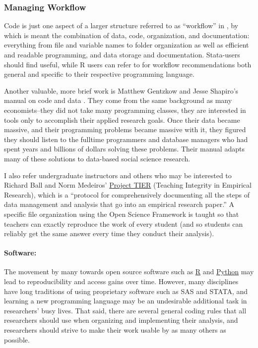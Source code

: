 \documentclass[12pt] {article}
\begin{document}
\subsubsection{Managing Workflow}\label{managing-workflow}

Code is just one aspect of a larger structure referred to as
``workflow'' in \cite{long_workflow_2008}, by which is meant the
combination of data, code, organization, and documentation: everything
from file and variable names to folder organization as well as efficient
and readable programming, and data storage and documentation. Stata-users should find \cite{long_workflow_2008} useful, while R users can refer to \cite{gandrud2013reproducible} for workflow recommendations both general and specific to their respective programming language.

Another valuable, more brief work is Matthew Gentzkow and Jesse Shapiro's manual on code and data \href{http://faculty.chicagobooth.edu/jesse.shapiro/research/CodeAndData.pdf}{\citep{GentzkowShapiro}}. They come from the same background as many economists--they did not take many programming classes, they are interested in tools only to accomplish their applied research goals. Once their data became massive, and their programming problems became massive with it, they figured they should listen to the fulltime programmers and database managers who had spent years and billions of dollars solving these problems. Their manual adapts many of these solutions to data-based social science research.   

I also refer undergraduate instructors and others who may be interested to Richard Ball and Norm Medeiros' \href{http://www.haverford.edu/TIER/}{Project TIER} (Teaching Integrity in Empirical Research), which is a ``protocol for comprehensively documenting all the steps of data management and analysis that go into an empirical research paper.'' A specific file organization using the Open Science Framework is taught so that teachers can exactly reproduce the work of every student (and so students can reliably get the same answer every time they conduct their analysis). 

\paragraph{Software:}
The movement by many towards open source software such
as \href{http://www.r-project.org/}{R} and \href{https://www.python.org/}{Python} may lead to reproducibility and access gains over time. However, many disciplines have long
traditions of using proprietary software such as SAS and STATA, and
learning a new programming language may be an undesirable additional
task in researchers' busy lives. That said, there are several general
coding rules that all researchers should use when organizing and
implementing their analysis, and researchers should strive to make their
work usable by as many others as possible.
\end{document}
